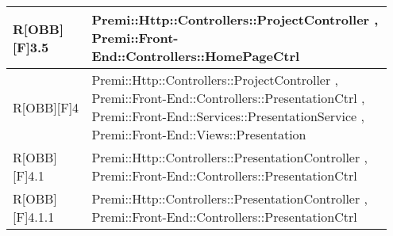 \begin{table}[h]
\begin{center}
\begin{tabular}{|p{0.2\linewidth}|p{0.75\linewidth}|}
		\midrule
			R[OBB][F]3.5 & Premi::Http::Controllers::ProjectController , Premi::Front-End::Controllers::HomePageCtrl\\
		\midrule
			R[OBB][F]4 & Premi::Http::Controllers::ProjectController , Premi::Front-End::Controllers::PresentationCtrl , Premi::Front-End::Services::PresentationService , Premi::Front-End::Views::Presentation\\
		\midrule
			R[OBB][F]4.1 & Premi::Http::Controllers::PresentationController , Premi::Front-End::Controllers::PresentationCtrl\\
		\midrule
			R[OBB][F]4.1.1 & Premi::Http::Controllers::PresentationController , Premi::Front-End::Controllers::PresentationCtrl\\

\bottomrule
\end{tabular}
\end{center}
\end{table}


